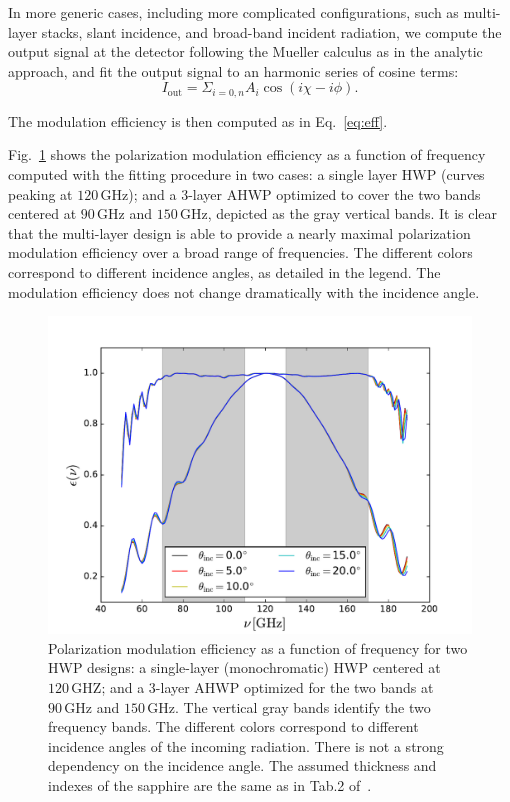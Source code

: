 In more generic cases, including more complicated configurations, such as multi-layer stacks, slant incidence, and broad-band incident radiation, we compute the output signal at the detector following the Mueller calculus as in the analytic approach, and fit the output signal to an harmonic series of cosine terms:
\begin{equation}
I_\mathrm{out}=\Sigma_{i=0,n} A_i \cos(i\chi-i\phi).
\end{equation}

The modulation efficiency is then computed as in Eq.~\ref{eq:eff}. %

Fig.~\ref{fig:eff} shows the polarization modulation efficiency as a function of frequency computed with the fitting procedure in two cases: a single layer HWP (curves peaking at $120\,\mathrm{GHz}$); and a 3-layer AHWP optimized to cover the two bands centered at $90\,\mathrm{GHz}$ and $150\,\mathrm{GHz}$, depicted as the gray vertical bands. It is clear that the multi-layer design is able to provide a nearly maximal polarization modulation efficiency over a broad range of frequencies. 
The different colors correspond to different incidence angles, as detailed in the legend. The modulation efficiency does not change dramatically with the incidence angle.

\begin{figure}
\begin{center}
\includegraphics{figures/Eps_vs_nu_3l_PB2.pdf}
\end{center}
\caption{Polarization modulation efficiency as a function of frequency for two HWP designs: a single-layer (monochromatic) HWP centered at $120\,\mathrm{GHZ}$; and a 3-layer AHWP optimized for the two bands at $90\,\mathrm{GHz}$ and $150\,\mathrm{GHz}$. The vertical gray bands identify the two frequency bands. The different colors correspond to different incidence angles of the incoming radiation. There is not a strong dependency on the incidence angle. The assumed thickness and indexes of the sapphire are the same as in Tab.2 of~\cite{PB2a_WHWP}.}\label{fig:eff}
\end{figure}



